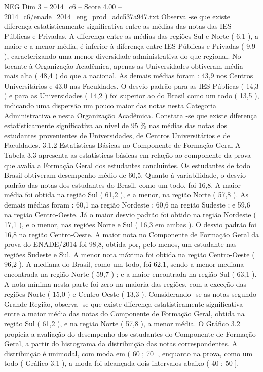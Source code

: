 \begin{textsample}{NEG Dim 3 – 2014\_c6 – Score 4.00 – 2014\_c6/enade\_2014\_eng\_prod\_adc537a947.txt}
Observa -se que existe diferença estatisticamente significativa entre as médias das notas das IES Públicas e Privadas.
A diferença entre as médias das regiões Sul e Norte ( 6,1 ), a maior e a menor média, é inferior à diferença entre IES Públicas e Privadas ( 9,9 ), caracterizando uma menor diversidade administrativa do que regional.
No tocante à Organização Acadêmica, apenas as Universidades obtiveram média mais alta ( 48,4 ) do que a nacional.
As demais médias foram : 43,9 nos Centros Universitários e 43,0 nas Faculdades.
O desvio padrão para as IES Públicas ( 14,3 ) e para as Universidades ( 14,2 ) foi superior ao do Brasil como um todo ( 13,5 ), indicando uma dispersão um pouco maior das notas nesta Categoria Administrativa e nesta Organização Acadêmica.
Constata -se que existe diferença estatisticamente significativa ao nível de 95 \% nas médias das notas dos estudantes provenientes de Universidades, de Centros Universitários e de Faculdades. 3.1.2 Estatísticas Básicas no Componente de Formação Geral A Tabela 3.3 apresenta as estatísticas básicas em relação ao componente da prova que avalia a Formação Geral dos estudantes concluintes.
Os estudantes de todo Brasil obtiveram desempenho médio de 60,5.
Quanto à variabilidade, o desvio padrão das notas dos estudantes do Brasil, como um todo, foi 16,8.
A maior média foi obtida na região Sul ( 61,2 ), e a menor, na região Norte ( 57,8 ).
As demais médias foram : 60,1 na região Nordeste ; 60,6 na região Sudeste ; e 59,6 na região Centro-Oeste.
Já o maior desvio padrão foi obtido na região Nordeste ( 17,1 ), e o menor, nas regiões Norte e Sul ( 16,3 em ambas ).
O desvio padrão foi 16,8 na região Centro-Oeste.
A maior nota no Componente de Formação Geral da prova do ENADE/2014 foi 98,8, obtida por, pelo menos, um estudante nas regiões Sudeste e Sul.
A menor nota máxima foi obtida na região Centro-Oeste ( 96,2 ).
A mediana do Brasil, como um todo, foi 62,1, sendo a menor mediana encontrada na região Norte ( 59,7 ) ; e a maior encontrada na região Sul ( 63,1 ).
A nota mínima nesta parte foi zero na maioria das regiões, com a exceção das regiões Norte ( 15,0 ) e Centro-Oeste ( 13,3 ).
Considerando -se as notas segundo Grande Região, observa -se que existe diferença estatisticamente significativa entre a maior média das notas do Componente de Formação Geral, obtida na região Sul ( 61,2 ), e na região Norte ( 57,8 ), a menor média.
O Gráfico 3.2 propicia a avaliação do desempenho dos estudantes do Componente de Formação Geral, a partir do histograma da distribuição das notas correspondentes.
A distribuição é unimodal, com moda em ( 60 ; 70 ], enquanto na prova, como um todo ( Gráfico 3.1 ), a moda foi alcançada dois intervalos abaixo ( 40 ; 50 ].

\end{textsample}
